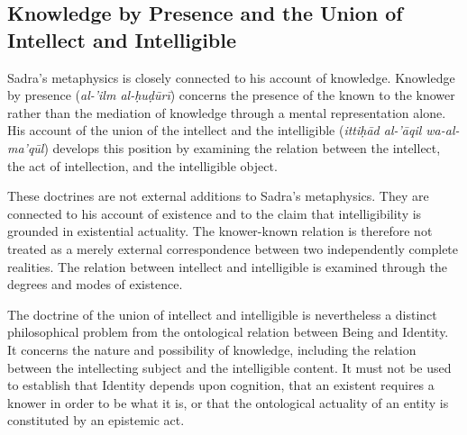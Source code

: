 


\subsection{Knowledge by Presence and the Union of Intellect and Intelligible}
\label{subsec:ch08_s17_ss13}

\label{para:VS.B01.P01.C08.S17.SS13.P001}

Sadra's metaphysics is closely
connected to his account
of knowledge. Knowledge by
presence (\textit{al-'ilm
al-ḥuḍūrī}) concerns the
presence of the known to
the knower rather than
the mediation of knowledge
through a mental representation
alone. His account of the
union of the intellect and
the intelligible
(\textit{ittiḥād al-'āqil
wa-al-ma'qūl}) develops
this position by examining
the relation between the
intellect, the act of
intellection, and the
intelligible object.

\label{para:VS.B01.P01.C08.S17.SS13.P002}

These doctrines are not
external additions to Sadra's
metaphysics. They are connected
to his account of existence
and to the claim that
intelligibility is grounded
in existential actuality.
The knower-known relation
is therefore not treated
as a merely external
correspondence between
two independently complete
realities. The relation
between intellect and
intelligible is examined
through the degrees and
modes of existence.

\label{para:VS.B01.P01.C08.S17.SS13.P003}

The doctrine of the union
of intellect and intelligible
is nevertheless a distinct
philosophical problem from
the ontological relation
between Being and Identity.
It concerns the nature
and possibility of knowledge,
including the relation
between the intellecting
subject and the intelligible
content. It must not be
used to establish that
Identity depends upon
cognition, that an existent
requires a knower in order
to be what it is, or that
the ontological actuality
of an entity is constituted
by an epistemic act.


